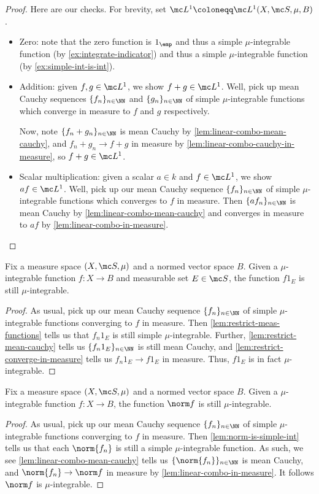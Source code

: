\documentclass[../notes.tex]{subfiles}
\begin{document}
\begin{proof}
	Here are our checks. For brevity, set $\mc L^1\coloneqq\mc L^1(X,\mc S,\mu,B)$.
	\begin{itemize}
		\item Zero: note that the zero function is $1_\emp$ and thus a simple $\mu$-integrable function (by \autoref{ex:integrate-indicator}) and thus a simple $\mu$-integrable function (by \autoref{ex:simple-int-is-int}).
		\item Addition: given $f,g\in\mc L^1$, we show $f+g\in\mc L^1$. Well, pick up mean Cauchy sequences $\{f_n\}_{n\in\NN}$ and $\{g_n\}_{n\in\NN}$ of simple $\mu$-integrable functions which converge in measure to $f$ and $g$ respectively.
		
		Now, note $\{f_n+g_n\}_{n\in\NN}$ is mean Cauchy by \autoref{lem:linear-combo-mean-cauchy}, and $f_n+g_n\to f+g$ in measure by \autoref{lem:linear-combo-cauchy-in-measure}, so $f+g\in\mc L^1$.
		\item Scalar multiplication: given a scalar $a\in k$ and $f\in\mc L^1$, we show $af\in\mc L^1$. Well, pick up our mean Cauchy sequence $\{f_n\}_{n\in\NN}$ of simple $\mu$-integrable functions which converges to $f$ in measure. Then $\{af_n\}_{n\in\NN}$ is mean Cauchy by \autoref{lem:linear-combo-mean-cauchy} and converges in measure to $af$ by \autoref{lem:linear-combo-in-measure}.
		\qedhere
	\end{itemize}
\end{proof}
\begin{lemma} \label{lem:restrict-int-function}
	Fix a measure space $(X,\mc S,\mu)$ and a normed vector space $B$. Given a $\mu$-integrable function $f\colon X\to B$ and measurable set $E\in\mc S$, the function $f1_E$ is still $\mu$-integrable.
\end{lemma}
\begin{proof}
	As usual, pick up our mean Cauchy sequence $\{f_n\}_{n\in\NN}$ of simple $\mu$-integrable functions converging to $f$ in measure. Then \autoref{lem:restrict-meas-functions} tells us that $f_n1_E$ is still simple $\mu$-integrable. Further, \autoref{lem:restrict-mean-cauchy} tells us $\{f_n1_E\}_{n\in\NN}$ is still mean Cauchy, and \autoref{lem:restrict-converge-in-measure} tells us $f_n1_E\to f1_E$ in measure. Thus, $f1_E$ is in fact $\mu$-integrable.
\end{proof}
\begin{lemma} \label{lem:norm-int-function}
	Fix a measure space $(X,\mc S,\mu)$ and a normed vector space $B$. Given a $\mu$-integrable function $f\colon X\to B$, the function $\norm f$ is still $\mu$-integrable.
\end{lemma}
\begin{proof}
	As usual, pick up our mean Cauchy sequence $\{f_n\}_{n\in\NN}$ of simple $\mu$-integrable functions converging to $f$ in measure. Then \autoref{lem:norm-is-simple-int} tells us that each $\norm{f_n}$ is still a simple $\mu$-integrable function. As such, we see \autoref{lem:linear-combo-mean-cauchy} tells us $\{\norm{f_n}\}_{n\in\NN}$ is mean Cauchy, and $\norm{f_n}\to\norm f$ in measure by \autoref{lem:linear-combo-in-measure}. It follows $\norm f$ is $\mu$-integrable.
\end{proof}
\end{document}
